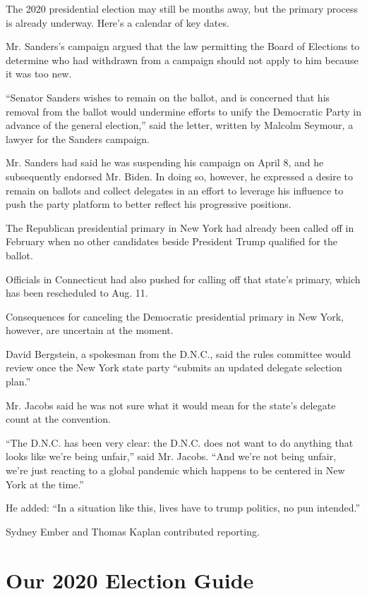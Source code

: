 The 2020 presidential election may still be months away, but the primary
process is already underway. Here's a calendar of key dates.

Mr. Sanders's campaign argued that the law permitting the Board of
Elections to determine who had withdrawn from a campaign should not
apply to him because it was too new.

``Senator Sanders wishes to remain on the ballot, and is concerned that
his removal from the ballot would undermine efforts to unify the
Democratic Party in advance of the general election,'' said the letter,
written by Malcolm Seymour, a lawyer for the Sanders campaign.

Mr. Sanders had said he was suspending his campaign on April 8, and he
subsequently endorsed Mr. Biden. In doing so, however, he expressed a
desire to remain on ballots and collect delegates in an effort to
leverage his influence to push the party platform to better reflect his
progressive positions.

The Republican presidential primary in New York had already been called
off in February when no other candidates beside President Trump
qualified for the ballot.

Officials in Connecticut had also pushed for calling off that state's
primary, which has been rescheduled to Aug. 11.

Consequences for canceling the Democratic presidential primary in New
York, however, are uncertain at the moment.

David Bergstein, a spokesman from the D.N.C., said the rules committee
would review once the New York state party ``submits an updated delegate
selection plan.''

Mr. Jacobs said he was not sure what it would mean for the state's
delegate count at the convention.

``The D.N.C. has been very clear: the D.N.C. does not want to do
anything that looks like we're being unfair,'' said Mr. Jacobs. ``And
we're not being unfair, we're just reacting to a global pandemic which
happens to be centered in New York at the time.''

He added: ``In a situation like this, lives have to trump politics, no
pun intended.''

Sydney Ember and Thomas Kaplan contributed reporting.

\hypertarget{our-2020-election-guide}{%
\section{Our 2020 Election Guide}\label{our-2020-election-guide}}

